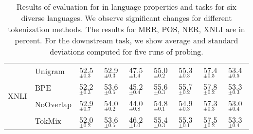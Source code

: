 \begin{table}
\begin{tabular}{lllllllll}
\cline{1-9}
\multirow{4}{*}{XNLI} & Unigram &  52.5 $_{\pm0.3}$ &  52.9 $_{\pm0.3}$ &  47.5 $_{\pm1.4}$ &  55.0 $_{\pm0.2}$ &  55.3 $_{\pm0.3}$ &  57.4 $_{\pm0.5}$ &  53.4 $_{\pm0.5}$ \\
     & BPE &  52.2 $_{\pm0.3}$ &  53.6 $_{\pm0.5}$ &  45.2 $_{\pm0.4}$ &  55.6 $_{\pm0.3}$ &  55.7 $_{\pm0.2}$ &  57.8 $_{\pm0.2}$ &  53.3 $_{\pm0.3}$ \\
     & NoOverlap &  52.9 $_{\pm0.7}$ &  54.0 $_{\pm0.2}$ &  44.0 $_{\pm0.8}$ &  54.8 $_{\pm0.1}$ &  54.9 $_{\pm0.3}$ &  57.3 $_{\pm0.3}$ &  53.0 $_{\pm0.4}$ \\
     & TokMix &  52.0 $_{\pm0.2}$ &  53.6 $_{\pm0.5}$ &  46.2 $_{\pm1.0}$ &  55.4 $_{\pm0.3}$ &  55.3 $_{\pm0.1}$ &  57.5 $_{\pm0.2}$ &  53.3 $_{\pm0.4}$ \\
\bottomrule
\end{tabular}
\caption{Results of evaluation for in-language properties and tasks for six diverse languages. We observe significant changes for different tokenization methods. The results for MRR, POS, NER, XNLI are in percent. For the downstream task, we show average and standard deviations computed for five runs of probing.}
\label{tab:in_lang}
\end{table}
